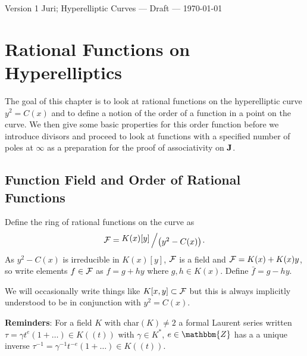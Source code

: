 \documentclass[english,11pt,a4paper]{article}
\begin{document}
Version 1 \scriptsize \hfill Juri; Hyperelliptic Curves --- Draft --- \today
\normalsize

\section{Rational Functions on Hyperelliptics}

The goal of this chapter is to look at rational functions on the hyperelliptic curve $y^2 = C(x)$ and to define a notion of the order of a function in a point on the curve. We then give some basic properties for this order function before we introduce divisors and proceed to look at functions with a specified number of poles at $\infty$ as a preparation for the proof of associativity on $\mathbf{J}$. %

\subsection{Function Field and Order of Rational Functions}

\begin{defin}
	Define the ring of rational functions on the curve as
	\begin{align*}
	  \F = \bigslant{K(x)[y]}{\big(y^2-C(x)\big)}.
	\end{align*}
  As $y^2-C(x)$ is irreducible in $K(x)[y]$, $\mathcal{F}$ is a field
  and $\mathcal{F} = K(x) + K(x) y$, so write elements $f \in \mathcal{F}$ as $f = g + hy$ where $g,h \in K(x)$. Define $\bar f = g - hy$.

  We will occasionally write things like $K[x,y] \subset \mathcal{F}$ but this is always implicitly understood to be in conjunction with $y^2=C(x)$.
\end{defin}

\vspace{3mm}

\textbf{Reminders}: For a field $K$ with char$(K) \neq 2$ a formal Laurent series written $\tau = \gamma t^e (1 + \dots)\in K (\! (t)\! )$ with $\gamma \in K^*$, $e \in \mathbbm{Z}$ has a a unique inverse $\tau^{-1} = \gamma^{-1} t^{-e} (1 + \dots) \in K (\! (t)\! )$.
\end{document}
